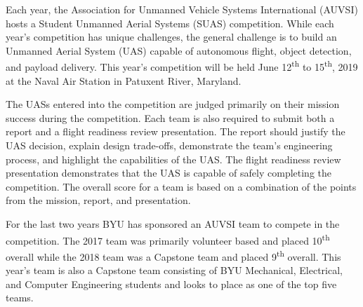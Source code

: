 
Each year, the Association for Unmanned Vehicle Systems International (AUVSI) hosts a Student Unmanned Aerial Systems (SUAS) competition. While each year's competition has unique challenges, the general challenge is to build an Unmanned Aerial System (UAS) capable of autonomous flight, object detection, and payload delivery. This year's competition will be held June 12\textsuperscript{th} to 15\textsuperscript{th}, 2019 at the Naval Air Station in Patuxent River, Maryland.

The UASs entered into the competition are judged primarily on their mission success during the competition. Each team is also required to submit both a report and a flight readiness review presentation. The report should justify the UAS decision, explain design trade-offs, demonstrate the team's engineering process, and highlight the capabilities of the UAS. The flight readiness review presentation demonstrates that the UAS is capable of safely completing the competition. The overall score for a team is based on a combination of the points from the mission, report, and presentation.

For the last two years BYU has sponsored an AUVSI team to compete in the competition. The 2017 team was primarily volunteer based and placed 10\textsuperscript{th} overall while the 2018 team was a Capstone team and placed 9\textsuperscript{th} overall. This year's team is also a Capstone team consisting of BYU Mechanical, Electrical, and Computer Engineering students and looks to place as one of the top five teams.